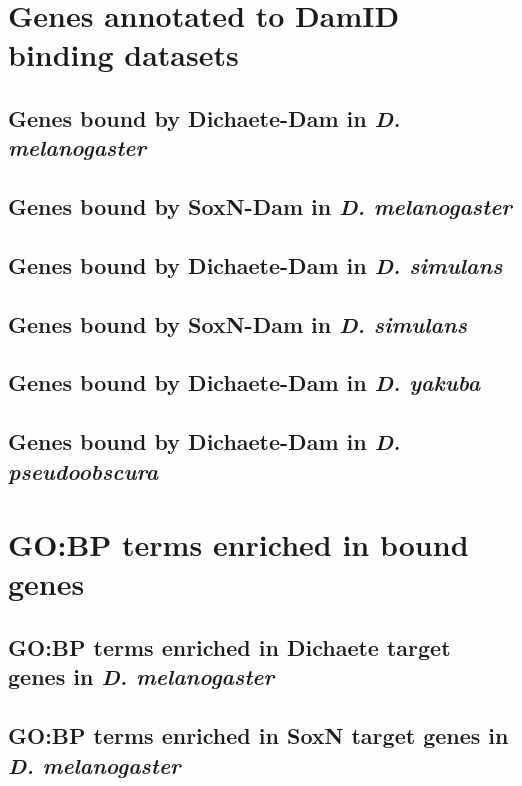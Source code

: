 \appendix

\chapter{Genes annotated to DamID binding datasets}
\section{Genes bound by Dichaete-Dam in \emph{D. melanogaster}}

\section{Genes bound by SoxN-Dam in \emph{D. melanogaster}}

\section{Genes bound by Dichaete-Dam in \emph{D. simulans}}

\section{Genes bound by SoxN-Dam in \emph{D. simulans}}

\section{Genes bound by Dichaete-Dam in \emph{D. yakuba}}

\section{Genes bound by Dichaete-Dam in \emph{D. pseudoobscura}}


\chapter{GO:BP terms enriched in bound genes}

\section{GO:BP terms enriched in Dichaete target genes in \emph{D. melanogaster}}

\section{GO:BP terms enriched in SoxN target genes in \emph{D. melanogaster}}

